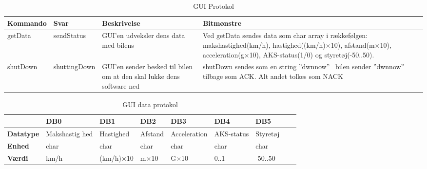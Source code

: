 \begin{table}[ht]
\begin{tabularx}{\textwidth}{| Z | Z | Z | Z |} \hline

\textbf{Kommando} 						&
\textbf{Svar}							&
\textbf{Beskrivelse}					&
\textbf{Bitmønstre}						\\ \hline

getData &

sendStatus &

GUI'en udveksler dens data med bilens &

Ved getData sendes data som char array i rækkefølgen: makshastighed(km/h), hastighed((km/h)$\times$10), afstand(m$\times$10), acceleration(g$\times$10), AKS-status(1/0) og styretøj(-50..50). \\ \hline



shutDown &

shuttingDown &

GUI'en sender besked til bilen om at den skal lukke dens software ned &

shutDown sendes som en string ''dwnnow'' \
bilen sender ''dwnnow'' tilbage som ACK. Alt andet tolkes som NACK \\ \hline

\end{tabularx}
\caption{GUI Protokol}
\label{tbl:prt_gui}
\end{table}



\begin{table}[ht]
\begin{tabularx}{\textwidth}{| Z | Z | Z | Z | Z | Z | Z | Z | Z |} \hline

\textbf{}	&
\textbf{DB0}	&
\textbf{DB1}	&
\textbf{DB2}	&
\textbf{DB3}	&
\textbf{DB4}	&
\textbf{DB5}	\\ \hline

\textbf{Datatype} & Makshastig hed & Hastighed & Afstand & Acceleration & AKS-status & Styretøj \\ \hline
\textbf{Enhed} & char & char & char & char & char &  char \\ \hline
\textbf{Værdi} & km/h & (km/h)$\times$10 & m$\times$10 & G$\times$10 & 0..1 & -50..50 \\ \hline

\end{tabularx}
\caption{GUI data protokol}
\label{tbl:prt_gui_byte}
\end{table}

